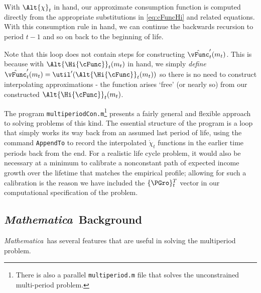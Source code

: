 \documentclass[titlepage]{\econtex}
\newcommand{\Mma}{\textit{Mathematica}}
\begin{document}
With $\Alt{\chi}_{t}$ in hand, our approximate consumption function
is computed directly from the appropriate substitutions in \eqref{eq:cFuncHi}
and related equations.  With this consumption
rule in hand, we can continue the backwards recursion to period $t-1$
and so on back to the beginning of life.

Note that this loop does not contain steps for constructing
$\hat{\vFunc}_{t}^{\prime}({m}_{t})$. This is because with
$\Alt{\Hi{\cFunc}}_{t}({m}_{t})$ in
hand, we simply \textit{define} $\hat{\vFunc}^{\prime}_{t}({m}_{t}) = \util^{\prime}(\Alt{\Hi{\cFunc}}_{t}({m}_{t}))$
so there is no need to construct interpolating approximations 
- the function arises `free' (or nearly so) from our constructed
$\Alt{\Hi{\cFunc}}_{t}({m}_{t})$.

The program \texttt{multiperiodCon.m}\footnote{There is also a parallel \texttt{multiperiod.m} file that solves the unconstrained multi-period problem.} presents a fairly general and
flexible approach to solving problems of this kind. The essential
structure of the program is a loop that simply works its way back
from an assumed last period of life, using the command
\texttt{AppendTo} to record the interpolated $\grave{\chi}_{t}$ functions
in the earlier time periods back from the end. For a
realistic life cycle problem, it would also be necessary at a
minimum to calibrate a nonconstant path of expected income growth over the
lifetime that matches the empirical profile; allowing for such
a calibration is the reason we have included the $\{\PGro\}_{t}^{T}$
vector in our computational specification of the problem.

\hypertarget{Mathmatica-Background}{}
\subsection{{\Mma}~Background}
{\Mma}~has several features that are useful in solving the
multiperiod problem.
\end{document}
